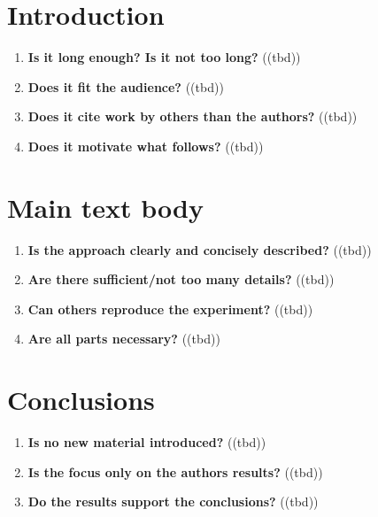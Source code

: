 \section{Introduction}\label{sec:introduction}
\begin{enumerate}[resume]
    \item \textbf{Is it long enough? Is it not too long?} 	\textcolor{HighlightColor}{((tbd))}
    \item \textbf{Does it fit the audience?} 	\textcolor{HighlightColor}{((tbd))}
    \item \textbf{Does it cite work by others than the authors?} 	\textcolor{HighlightColor}{((tbd))}
    \item \textbf{Does it motivate what follows?} 	\textcolor{HighlightColor}{((tbd))}
\end{enumerate}

\section{Main text body}\label{sec:main}
\begin{enumerate}[resume]
    \item \textbf{Is the approach clearly and concisely described?} 	\textcolor{HighlightColor}{((tbd))}
    \item \textbf{Are there sufficient/not too many details?} 	\textcolor{HighlightColor}{((tbd))}
    \item \textbf{Can others reproduce the experiment?} 	\textcolor{HighlightColor}{((tbd))}
    \item \textbf{Are all parts necessary?} 	\textcolor{HighlightColor}{((tbd))}
\end{enumerate}

\section{Conclusions}\label{sec:conclusions}
\begin{enumerate}[resume]
    \item \textbf{Is no new material introduced?} 	\textcolor{HighlightColor}{((tbd))}
    \item \textbf{Is the focus only on the authors results?} 	\textcolor{HighlightColor}{((tbd))}
    \item \textbf{Do the results support the conclusions?} 	\textcolor{HighlightColor}{((tbd))}
\end{enumerate}

